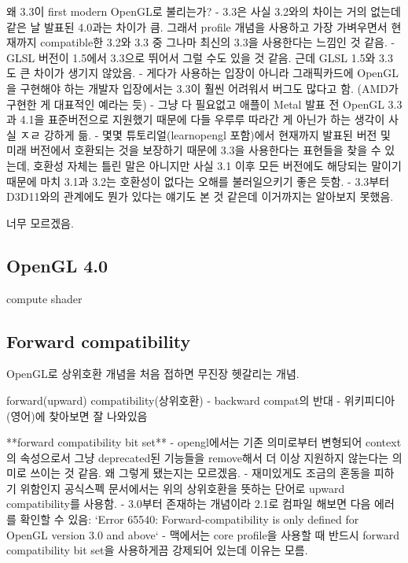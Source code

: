 \documentclass[a4paper]{report}
\begin{document}
왜 3.3이 first modern OpenGL로 불리는가?
- 3.3은 사실 3.2와의 차이는 거의 없는데 같은 날 발표된 4.0과는 차이가 큼. 그래서 profile 개념을 사용하고 가장 가벼우면서 현재까지 compatible한 3.2와 3.3 중 그나마 최신의 3.3을 사용한다는 느낌인 것 같음.
- GLSL 버전이 1.5에서 3.3으로 뛰어서 그럴 수도 있을 것 같음. 근데 GLSL 1.5와 3.3도 큰 차이가 생기지 않았음.
- 게다가 사용하는 입장이 아니라 그래픽카드에 OpenGL을 구현해야 하는 개발자 입장에서는 3.3이 훨씬 어려워서 버그도 많다고 함. (AMD가 구현한 게 대표적인 예라는 듯)
- 그냥 다 필요없고 애플이 Metal 발표 전 OpenGL 3.3과 4.1을 표준버전으로 지원했기 때문에 다들 우루루 따라간 게 아닌가 하는 생각이 사실 ㅈㄹ 강하게 듦.
- 몇몇 튜토리얼(learnopengl 포함)에서 현재까지 발표된 버전 및 미래 버전에서 호환되는 것을 보장하기 때문에 3.3을 사용한다는 표현들을 찾을 수 있는데, 호환성 자체는 틀린 말은 아니지만 사실 3.1 이후 모든 버전에도 해당되는 말이기 때문에 마치 3.1과 3.2는 호환성이 없다는 오해를 불러일으키기 좋은 듯함.
- 3.3부터 D3D11와의 관계에도 뭔가 있다는 얘기도 본 것 같은데 이거까지는 알아보지 못했음.

너무 모르겠음.



\subsection{OpenGL 4.0}
compute shader



\subsection{Forward compatibility}
OpenGL로 상위호환 개념을 처음 접하면 무진장 헷갈리는 개념.

forward(upward) compatibility(상위호환)
- backward compat의 반대
- 위키피디아(영어)에 찾아보면 잘 나와있음

**forward compatibility bit set**
- opengl에서는 기존 의미로부터 변형되어 context의 속성으로서 그냥 deprecated된 기능들을 remove해서 더 이상 지원하지 않는다는 의미로 쓰이는 것 같음. 왜 그렇게 됐는지는 모르겠음.
- 재미있게도 조금의 혼동을 피하기 위함인지 공식스펙 문서에서는 위의 상위호환을 뜻하는 단어로 upward compatibility를 사용함.
- 3.0부터 존재하는 개념이라 2.1로 컴파일 해보면 다음 에러를 확인할 수 있음:
	`Error 65540: Forward-compatibility is only defined for OpenGL version 3.0 and above`
- 맥에서는 core profile을 사용할 때 반드시 forward compatibility bit set을 사용하게끔 강제되어 있는데 이유는 모름.
\end{document}
